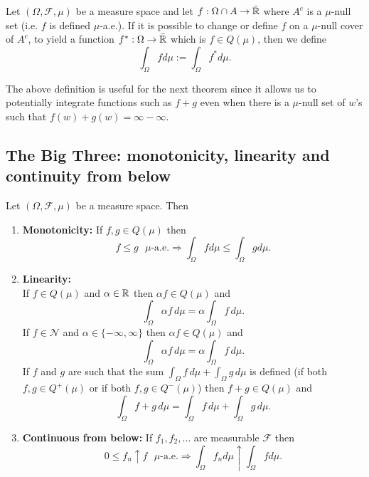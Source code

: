 \begin{definition}
Let $(\Omega, \mathcal F, \mu)$ be a measure space and let $f: \Omega\cap A \rightarrow \bar{\Bbb R}$ where $A^c$ is a $\mu$-null set (i.e. $f$ is defined $\mu$-a.e.). If it is possible to change or define $f$ on a $\mu$-null cover of $A^c$, to yield a function $f^*:\Omega\rightarrow \bar{\Bbb R}$ which is $f\in Q(\mu)$, then we define
\[  \int_{\Omega} f d\mu:= \int_{\Omega} f^* d\mu. \]
\end{definition}


\begin{remark}
The above definition is useful for the next theorem since it allows us to potentially  integrate functions such as $f+g$ even when there is a $\mu$-null set of $w$'s such that $f(w)+ g(w)=\infty - \infty$.
\end{remark}



\subsection{The Big Three: monotonicity, linearity and continuity from below}






\begin{theorem} Let $(\Omega, \mathcal F, \mu)$ be a measure space. Then
\begin{enumerate}
\item {\bf Monotonicity:} If $f, g \in Q(\mu)$ then
\[ \text{$f\leq g$ $\mu$-a.e.}\Longrightarrow \int_\Omega fd\mu\leq \int_\Omega g d\mu.  \]
\item {\bf Linearity:}\\
If $f\in Q(\mu)$ and $\alpha \in \Bbb R$ then $\alpha f\in Q(\mu)$ and
\[
\int_\Omega \alpha f \,d\mu =  \alpha \int_\Omega f\,d\mu.
\]
If $f\in \mathscr N$ and $\alpha \in \{-\infty, \infty\}$ then $\alpha f\in Q(\mu)$ and
\[
\int_\Omega \alpha f \,d\mu =  \alpha \int_\Omega f\,d\mu.
\]
If $f$ and $g$ are such that the sum $ \int_\Omega f\,d\mu + \int_\Omega g\,d\mu$ is defined (if both $f,g\in Q^+(\mu)$ or if both $f,g \in Q^-(\mu)$) then \mbox{$f+g\in Q(\mu)$} and
\[
\int_\Omega f +  g \,d\mu =  \int_\Omega f\,d\mu + \int_\Omega g\,d\mu.
\]


\item {\bf Continuous from below:} If $f_1, f_2,\ldots$ are measurable $\mathcal F$ then
\[ \text{$0\leq f_n\uparrow f$ $\mu$-a.e.}\Longrightarrow \int_\Omega f_nd\mu\uparrow \int_\Omega f d\mu.  \]
\end{enumerate}
\end{theorem}

